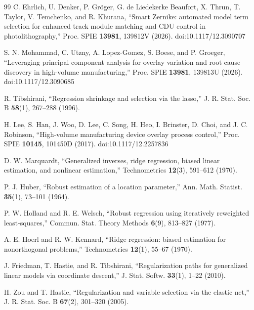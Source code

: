 \documentclass[11pt,a4paper]{ltjsarticle}
\begin{document}
\begin{thebibliography}{99}
C. Ehrlich, U. Denker, P. Gr\"{o}ger, G. de Liedekerke Beaufort, X. Thrun, T. Taylor, V. Temchenko, and R. Khurana,
``Smart Zernike: automated model term selection for enhanced track module matching and CDU control in photolithography,''
Proc. SPIE \textbf{13981}, 139812V (2026). doi:10.1117/12.3090707

S. N. Mohammad, C. Utzny, A. Lopez-Gomez, S. Boese, and P. Groeger,
``Leveraging principal component analysis for overlay variation and root cause discovery in high-volume manufacturing,''
Proc. SPIE \textbf{13981}, 139813U (2026). doi:10.1117/12.3090685

R. Tibshirani,
``Regression shrinkage and selection via the lasso,''
J. R. Stat. Soc. B \textbf{58}(1), 267--288 (1996).

H. Lee, S. Han, J. Woo, D. Lee, C. Song, H. Heo, I. Brinster, D. Choi, and J. C. Robinson,
``High-volume manufacturing device overlay process control,''
Proc. SPIE \textbf{10145}, 101450D (2017). doi:10.1117/12.2257836

D. W. Marquardt,
``Generalized inverses, ridge regression, biased linear estimation, and nonlinear estimation,''
Technometrics \textbf{12}(3), 591--612 (1970).

P. J. Huber,
``Robust estimation of a location parameter,''
Ann. Math. Statist. \textbf{35}(1), 73--101 (1964).

P. W. Holland and R. E. Welsch,
``Robust regression using iteratively reweighted least-squares,''
Commun. Stat. Theory Methods \textbf{6}(9), 813--827 (1977).

A. E. Hoerl and R. W. Kennard,
``Ridge regression: biased estimation for nonorthogonal problems,''
Technometrics \textbf{12}(1), 55--67 (1970).

J. Friedman, T. Hastie, and R. Tibshirani,
``Regularization paths for generalized linear models via coordinate descent,''
J. Stat. Softw. \textbf{33}(1), 1--22 (2010).

H. Zou and T. Hastie,
``Regularization and variable selection via the elastic net,''
J. R. Stat. Soc. B \textbf{67}(2), 301--320 (2005).

\end{thebibliography}
\end{document}
